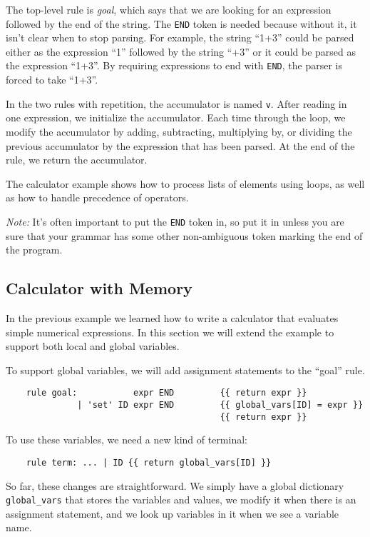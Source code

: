 \documentclass[10pt]{article}
\newcommand{\mysubsection}[1]{\subsection{#1}}
\begin{document}
The top-level rule is \emph{goal}, which says that we are looking for
an expression followed by the end of the string.  The \texttt{END}
token is needed because without it, it isn't clear when to stop
parsing.  For example, the string ``1+3'' could be parsed either as
the expression ``1'' followed by the string ``+3'' or it could be
parsed as the expression ``1+3''.  By requiring expressions to end
with \texttt{END}, the parser is forced to take ``1+3''.

In the two rules with repetition, the accumulator is named \texttt{v}.
After reading in one expression, we initialize the accumulator.  Each
time through the loop, we modify the accumulator by adding,
subtracting, multiplying by, or dividing the previous accumulator by
the expression that has been parsed.  At the end of the rule, we
return the accumulator.

The calculator example shows how to process lists of elements using
loops, as well as how to handle precedence of operators.

\emph{Note:} It's often important to put the \texttt{END} token in, so 
put it in unless you are sure that your grammar has some other
non-ambiguous token marking the end of the program.

\mysubsection{Calculator with Memory}

In the previous example we learned how to write a calculator that
evaluates simple numerical expressions.  In this section we will
extend the example to support both local and global variables.

To support global variables, we will add assignment statements to the
``goal'' rule.

\begin{verbatim}
    rule goal:           expr END         {{ return expr }}
              | 'set' ID expr END         {{ global_vars[ID] = expr }}
                                          {{ return expr }}   
\end{verbatim}

To use these variables, we need a new kind of terminal:

\begin{verbatim}
    rule term: ... | ID {{ return global_vars[ID] }} 
\end{verbatim}

So far, these changes are straightforward.  We simply have a global
dictionary \texttt{global\_vars} that stores the variables and values, 
we modify it when there is an assignment statement, and we look up
variables in it when we see a variable name.
\end{document}
